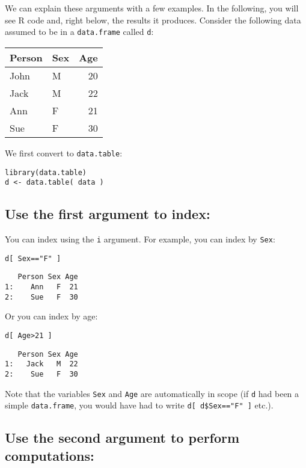 \documentclass[11pt]{article}
\begin{document}
We can explain these arguments with a few examples. In the following,
you will see R code and, right below, the results it
produces. Consider the following data assumed to be in a \verb~data.frame~
called \verb~d~:

\begin{center}
\begin{tabular}{llr}
Person & Sex & Age\\
\hline
John & M & 20\\
Jack & M & 22\\
Ann & F & 21\\
Sue & F & 30\\
\end{tabular}
\end{center}

We first convert to \verb~data.table~:

\lstset{language=R,label= ,caption= ,numbers=none}
\begin{lstlisting}
library(data.table)
d <- data.table( data )
\end{lstlisting}

\subsection*{Use the first argument to index:}
\label{sec-2-2}

You can index using the \verb~i~ argument. For example, you can index by
\verb~Sex~:
\lstset{language=R,label= ,caption= ,numbers=none}
\begin{lstlisting}
d[ Sex=="F" ]
\end{lstlisting}

\begin{verbatim}
   Person Sex Age
1:    Ann   F  21
2:    Sue   F  30
\end{verbatim}

Or you can index by age:
\lstset{language=R,label= ,caption= ,numbers=none}
\begin{lstlisting}
d[ Age>21 ]
\end{lstlisting}

\begin{verbatim}
   Person Sex Age
1:   Jack   M  22
2:    Sue   F  30
\end{verbatim}

Note that the variables \verb~Sex~ and \verb~Age~ are automatically in scope (if
\verb~d~ had been a simple \verb~data.frame~, you would have had to write 
\verb~d[ d$Sex=="F" ]~ etc.).

\subsection*{Use the second argument to perform computations:}
\label{sec-2-3}
\end{document}

